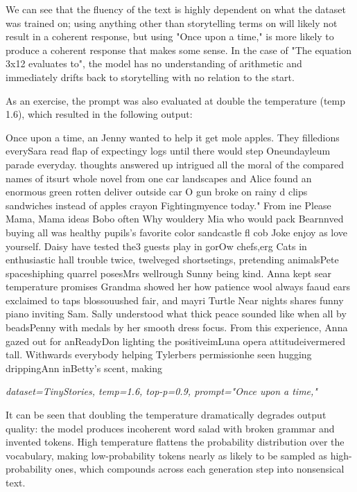 \documentclass[letterpaper]{article}
\newenvironment{modeloutput}[1]{%
	\begin{mdframed}[backgroundcolor=gray!8, linecolor=gray!60, linewidth=0.8pt,
		innerleftmargin=8pt, innerrightmargin=8pt, innertopmargin=6pt, innerbottommargin=6pt]%
	\small\ttfamily\raggedright
}{%
	\end{mdframed}%
}
\begin{document}
We can see that the fluency of the text is highly dependent on what the dataset was trained on; using anything other than storytelling terms on will likely not result in a coherent response, but using "Once upon a time," is more likely to produce a coherent response that makes some sense. In the case of "The equation 3x12 evaluates to", the model has no understanding of arithmetic and immediately drifts back to storytelling with no relation to the start.

As an exercise, the prompt was also evaluated at double the temperature (temp 1.6), which resulted in the following output:

\begin{modeloutput}{}
Once upon a time, an Jenny wanted to help it get mole apples. They filledions everySara read flap of expectingy logs until there would step Oneundayleum parade everyday. thoughts answered up intrigued all the moral of the compared names of itsurt whole novel from one car landscapes and Alice found an enormous green rotten deliver outside car O gun broke on rainy d clips sandwiches instead of apples crayon Fightingmyence today." From ine Please Mama, Mama ideas Bobo often Why wouldery Mia who would pack Bearnnved buying all was healthy pupils's favorite color sandcastle fl cob Joke enjoy as love yourself. Daisy have tested the3 guests play in gorOw chefs,erg Cats in enthusiastic hall trouble twice, twelveged shortsetings, pretending animalsPete spaceshiphing quarrel posesMrs wellrough Sunny being kind. Anna kept sear temperature promises Grandma showed her how patience wool always faaud ears exclaimed to taps blossouushed fair, and mayri Turtle Near nights shares funny piano inviting Sam. Sally understood what thick peace sounded like when all by beadsPenny with medals by her smooth dress focus.
From this experience, Anna gazed out for anReadyDon lighting the positiveimLuna opera attitudeivermered tall. Withwards everybody helping Tylerbers permissionhe seen hugging drippingAnn inBetty's scent, making
\end{modeloutput}
\noindent\textit{\small dataset=TinyStories, temp=1.6, top-p=0.9, prompt="Once upon a time,"}

It can be seen that doubling the temperature dramatically degrades output quality: the model produces incoherent word salad with broken grammar and invented tokens. High temperature flattens the probability distribution over the vocabulary, making low-probability tokens nearly as likely to be sampled as high-probability ones, which compounds across each generation step into nonsensical text.
\end{document}
